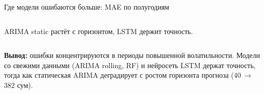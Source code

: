 \begin{frame}{Где модели ошибаются больше: MAE по полугодиям}
\begin{columns}[T]
    {\tiny\color{mygray}ARIMA static растёт с горизонтом, LSTM держит точность.}
  \end{columns}

  \vspace{0.2cm}
  \begin{tcolorbox}[infobox]
    \small \textbf{Вывод:} ошибки концентрируются в периоды повышенной волатильности. Модели со свежими данными (ARIMA rolling, RF) и нейросеть LSTM держат точность, тогда как статическая ARIMA деградирует с ростом горизонта прогноза (40\,$\to$\,382 сум).
  \end{tcolorbox}
\end{frame}